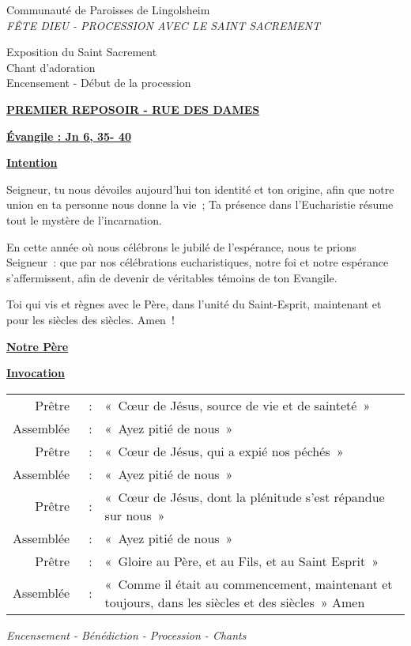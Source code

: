 \documentclass[french,11pt,a4paper]{article}
\newcommand{\JournalName}[1]{%
		\begin{center}
            \Large \usefont{T1}{augie}{m}{n}
			#1%
		\end{center}
		\par \normalsize \normalfont}
\newcommand{\NewsItem}[1]{%
\vspace{3pt}
\underline{\textbf{#1}}
		  }
\begin{document}
\begin{center}
\JournalName{Communauté de Paroisses de Lingolsheim \\
  \normalsize \textit{
FÊTE DIEU -
PROCESSION AVEC LE SAINT SACREMENT
}
}
\end{center}

Exposition du Saint Sacrement\\
Chant d'adoration\\
Encensement - Début de la procession

\NewsItem{PREMIER REPOSOIR - RUE DES DAMES}

\NewsItem{Évangile : Jn 6, 35- 40}

\NewsItem{Intention}
Seigneur, tu nous dévoiles aujourd’hui ton identité et ton origine, afin que notre union en ta personne nous donne la vie ; Ta présence dans l’Eucharistie résume tout le mystère de l’incarnation.

En cette année où nous célébrons le jubilé de l’espérance, nous te prions Seigneur : que par nos célébrations eucharistiques, notre foi et notre espérance s’affermissent, afin de devenir de véritables témoins de ton Evangile.

Toi qui vis et règnes avec le Père, dans l’unité du Saint-Esprit, maintenant et pour les siècles des siècles. Amen !

\NewsItem{Notre Père}

\NewsItem{Invocation}

\begin{tabular}{rcp{10cm}}
Prêtre & : &		« Cœur de Jésus, source de vie et de sainteté » \\
Assemblée & : &	« Ayez pitié de nous » \\
Prêtre & : &		« Cœur de Jésus, qui a expié nos péchés » \\
Assemblée & : &	« Ayez pitié de nous » \\
Prêtre & : &		« Cœur de Jésus, dont la plénitude s’est répandue sur nous » \\
Assemblée & : &	« Ayez pitié de nous » \\
Prêtre & : &		« Gloire au Père, et au Fils, et au Saint Esprit » \\
Assemblée & : &	« Comme il était au commencement, maintenant et toujours, dans les siècles et des siècles » Amen  \\
\end{tabular}
\emph{Encensement - Bénédiction - Procession - Chants}
\end{document}
